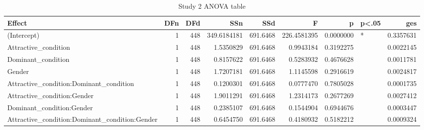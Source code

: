 \begin{table}

\caption{Study 2 ANOVA table}
\centering
\begin{tabular}[t]{lrrrrrrlr}
\toprule
Effect & DFn & DFd & SSn & SSd & F & p & p<.05 & ges\\
\midrule
(Intercept) & 1 & 448 & 349.6184181 & 691.6468 & 226.4581395 & 0.0000000 & * & 0.3357631\\
Attractive\_condition & 1 & 448 & 1.5350829 & 691.6468 & 0.9943184 & 0.3192275 &  & 0.0022145\\
Dominant\_condition & 1 & 448 & 0.8157622 & 691.6468 & 0.5283932 & 0.4676628 &  & 0.0011781\\
Gender & 1 & 448 & 1.7207181 & 691.6468 & 1.1145598 & 0.2916619 &  & 0.0024817\\
Attractive\_condition:Dominant\_condition & 1 & 448 & 0.1200301 & 691.6468 & 0.0777470 & 0.7805028 &  & 0.0001735\\
\addlinespace
Attractive\_condition:Gender & 1 & 448 & 1.9011291 & 691.6468 & 1.2314173 & 0.2677269 &  & 0.0027412\\
Dominant\_condition:Gender & 1 & 448 & 0.2385107 & 691.6468 & 0.1544904 & 0.6944676 &  & 0.0003447\\
Attractive\_condition:Dominant\_condition:Gender & 1 & 448 & 0.6454750 & 691.6468 & 0.4180932 & 0.5182212 &  & 0.0009324\\
\bottomrule
\end{tabular}
\end{table}
